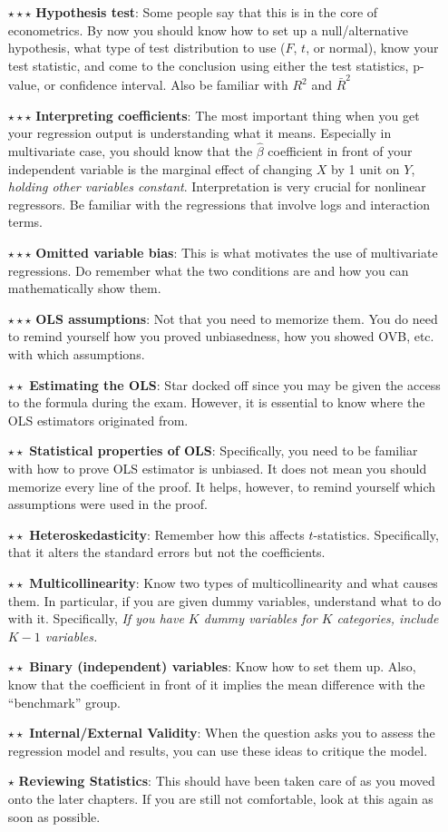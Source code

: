 \documentclass[12pt]{article}
\theoremstyle{definition}
\theoremstyle{property}
\theoremstyle{assumption}
\theoremstyle{example}
\theoremstyle{comment}
\begin{document}
\begin{itemize}
\item[$\star\star\star$] \textbf{Hypothesis test}: Some people say that this is in the core of econometrics. By now you should know how to set up a null/alternative hypothesis, what type of test distribution to use ($F$, $t$, or normal), know your test statistic, and come to the conclusion using either the test statistics, p-value, or confidence interval. Also be familiar with $R^2$ and $\bar{R}^2$
\item[$\star\star\star$] \textbf{Interpreting coefficients}: The most important thing when you get your regression output is understanding what it means. Especially in multivariate case, you should know that the $\hat{\beta}$ coefficient in front of your independent variable is the marginal effect of changing $X$ by 1 unit on $Y$, \textit{holding other variables constant}. Interpretation is very crucial for nonlinear regressors. Be familiar with the regressions that involve logs and interaction terms. 
\item[$\star\star\star$]\textbf{Omitted variable bias}: This is what motivates the use of multivariate regressions. Do remember what the two conditions are and how you can mathematically show them.
\item[$\star\star\star$] \textbf{OLS assumptions}: Not that you need to memorize them. You do need to remind yourself how you proved unbiasedness, how you showed OVB, etc. with which assumptions. 
\item[$\star\star$] \textbf{Estimating the OLS}: Star docked off since you may be given the access to the formula during the exam. However, it is essential to know where the OLS estimators originated from. 
\item[$\star\star$] \textbf{Statistical properties of OLS}: Specifically, you need to be familiar with how to prove OLS estimator is unbiased. It does not mean you should memorize every line of the proof. It helps, however, to remind yourself which assumptions were used in the proof.
\item[$\star\star$]\textbf{Heteroskedasticity}: Remember how this affects $t$-statistics. Specifically, that it alters the standard errors but not the coefficients.  
\item[$\star\star$]\textbf{Multicollinearity}: Know two types of multicollinearity and what causes them. In particular, if you are given dummy variables, understand what to do with it. Specifically, \textit{If you have $K$ dummy variables for $K$ categories, include $K-1$ variables.}
\item[$\star\star$]\textbf{Binary (independent) variables}: Know how to set them up. Also, know that the coefficient in front of it implies the mean difference with the ``benchmark'' group.
\item[$\star\star$]\textbf{Internal/External Validity}: When the question asks you to assess the regression model and results, you can use these ideas to critique the model. 
\item[$\star$]\textbf{Reviewing Statistics}: This should have been taken care of as you moved onto the later chapters. If you are still not comfortable, look at this again as soon as possible. 
\end{itemize}
\end{document}
